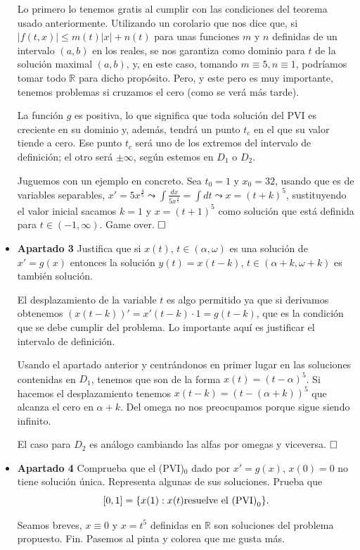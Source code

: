 \documentclass[spanish, a4paper, 12pt] {article}
\begin{document}
\begin{itemize}
{Lo primero lo tenemos gratis al cumplir con las condiciones del teorema usado anteriormente. Utilizando un corolario que nos dice que, si $|f(t, x)| \le m(t)|x| + n(t)$ para unas funciones $m$ y $n$ definidas de un intervalo $(a,b)$ en los reales, se nos garantiza como dominio para $t$ de la solución maximal $(a,b)$, y, en este caso, tomando $m \equiv 5, n \equiv 1$, podríamos tomar todo $\mathbb{R}$ para dicho propósito. Pero, y este pero es muy importante, tenemos problemas si cruzamos el cero (como se verá más tarde).

La función $g$ es positiva, lo que significa que toda solución del PVI es creciente en su dominio y, además, tendrá un punto $t_c$ en el que su valor tiende a cero. Ese punto $t_c$ será uno de los extremos del intervalo de definición; el otro será $\pm\infty$, según estemos en $D_1$ o $D_2$.

Juguemos con un ejemplo en concreto. Sea $t_0 = 1$ y $x_0 = 32$, usando que es de variables separables, $x' = 5x^{\frac{4}{5}} \leadsto \int \frac{dx}{5x^{\frac{4}{5}}} = \int dt \leadsto x = (t + k)^{5}$, sustituyendo el valor inicial sacamos $k = 1$ y $x = (t + 1)^5$ como solución que está definida para $t\in(-1, \infty)$. Game over.
$\hfill \square$
}
\item{
\textbf{Apartado 3} Justifica que si $x(t)$, $t\in(\alpha, \omega)$ es una solución de $x' = g(x)$ entonces la solución $y(t) = x(t-k)$, $t\in(\alpha + k, \omega + k)$ es también solución.

El desplazamiento de la variable $t$ es algo permitido ya que si derivamos obtenemos $(x(t-k))' = x'(t-k)\cdot1 = g(t-k)$, que es la condición que se debe cumplir del problema. Lo importante aquí es justificar el intervalo de definición.

Usando el apartado anterior y centrándonos en primer lugar en las soluciones contenidas en $D_1$, tenemos que son de la forma $x(t) = (t - \alpha)^{5}$. Si hacemos el desplazamiento tenemos $x(t-k) = (t - (\alpha + k))^{5}$ que alcanza el cero en $\alpha + k$. Del omega no nos preocupamos porque sigue siendo infinito.

El caso para $D_2$ es análogo cambiando las alfas por omegas y viceversa.
$\hfill \square$
}
\item{
\textbf{Apartado 4} Comprueba que el (PVI)$_0$ dado por $x' = g(x)$, $x(0) = 0$ no tiene solución única. Representa algunas de sus soluciones. Prueba que $$[0,1] = \{x(1): x(t) \hbox{resuelve el (PVI)}_0\}.$$

Seamos breves, $x\equiv0$ y $x = t^5$ definidas en $\mathbb{R}$ son soluciones del problema propuesto. Fin. Pasemos al pinta y colorea que me gusta más.

}
\end{itemize}
\end{document}

